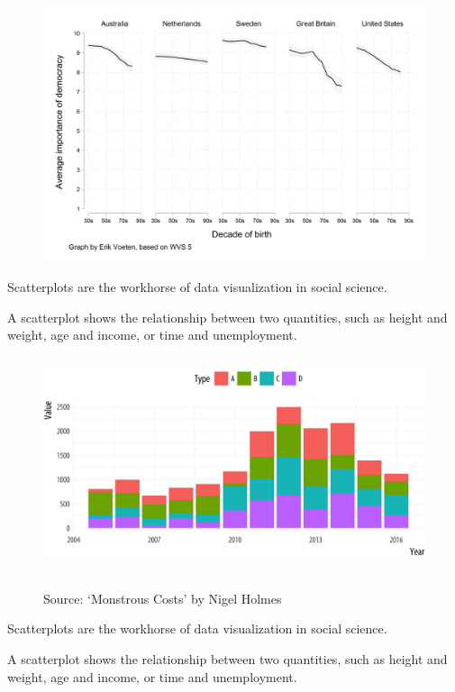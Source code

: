 \documentclass[11pt]{beamer}
\begin{document}
\begin{frame}
	
	\frametitle{\bfseries}
	\begin{figure}
		\vspace{-1em}
		\includegraphics[width=0.9\linewidth]{Figure/democracy-voeten-version-2}
	\end{figure}
	\begin{itemize}
		\vspace{-1em}
		\footnotesize{
			\item Scatterplots are the workhorse of data visualization in social science.
			\item A scatterplot shows the relationship between two quantities, such as height and weight, age and income, or time and unemployment. }
	\end{itemize}
\end{frame}
\begin{frame}
	
	\frametitle{\bfseries}
	\begin{figure}
		\vspace{-.5em}
		\includegraphics[width=0.8\linewidth]{Figure/preception-data-1}
		
		\\
		\tiny{Source: `Monstrous Costs’ by Nigel Holmes}
		\label{fig:anscombe-1}
	\end{figure}
	\begin{itemize}
		\footnotesize{
			\item Scatterplots are the workhorse of data visualization in social science.
			\item A scatterplot shows the relationship between two quantities, such as height and weight, age and income, or time and unemployment. }
	\end{itemize}
\end{frame}
\end{document}
